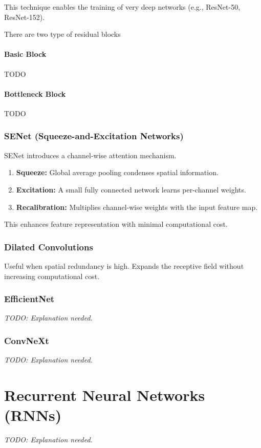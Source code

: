 \documentclass{article}
\begin{document}
This technique enables the training of very deep networks (e.g., ResNet-50, ResNet-152).

There are two type of residual blocks

\paragraph{Basic Block} TODO
\paragraph{Bottleneck Block} TODO

\subsubsection{SENet (Squeeze-and-Excitation Networks)}
SENet introduces a channel-wise attention mechanism.
\begin{enumerate}
    \item \textbf{Squeeze:} Global average pooling condenses spatial information.
    \item \textbf{Excitation:} A small fully connected network learns per-channel weights.
    \item \textbf{Recalibration:} Multiplies channel-wise weights with the input feature map.
\end{enumerate}
This enhances feature representation with minimal computational cost.

\subsubsection{Dilated Convolutions}
Useful when spatial redundancy is high. Expands the receptive field without increasing computational cost.

\subsubsection{EfficientNet}
\textit{TODO: Explanation needed.}

\subsubsection{ConvNeXt}
\textit{TODO: Explanation needed.}

\section{Recurrent Neural Networks (RNNs)}
\textit{TODO: Explanation needed.}
\end{document}
